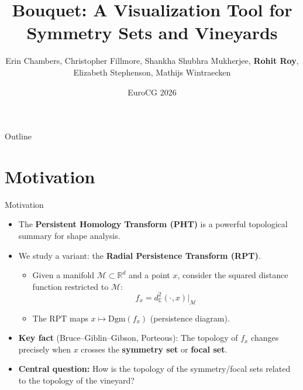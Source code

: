 \documentclass[
	11pt, %
]{beamer}
\title[Bouquet2D]{Bouquet: A Visualization Tool for Symmetry Sets and Vineyards}
\author[Rohit Roy]{Erin Chambers, Christopher Fillmore, Shankha Shubhra Mukherjee, \textcolor{myNewColorC}{\textbf{Rohit Roy}}, Elizabeth Stephenson, Mathijs Wintraecken}
\date[EuroCG 2026]{EuroCG 2026}
\newcommand{\M}{\mathcal{M}}
\begin{document}

\begin{frame}
	\titlepage
\end{frame}


\begin{frame}{Outline}
	\tableofcontents
\end{frame}


\section{Motivation}

\begin{frame}{Motivation}
    \begin{itemize}
        \item The \textbf{Persistent Homology Transform (PHT)} is a powerful topological summary for shape analysis.
        \pause
        \item We study a variant: the \textbf{Radial Persistence Transform (RPT)}.
        \begin{itemize}
            \item Given a manifold $\M \subset \mathbb{R}^d$ and a point $x$, consider the squared distance function restricted to $\M$:
            \[
            f_x = d_{\mathbb{E}}^2(\cdot, x)\big|_{\M}
            \]
            \item The RPT maps $x \mapsto \mathrm{Dgm}(f_x)$ (persistence diagram).
        \end{itemize}
        \pause
        \item \textbf{Key fact} (Bruce--Giblin--Gibson, Porteous): The topology of $f_x$ changes precisely when $x$ crosses the \textbf{symmetry set} or \textbf{focal set}.
        \pause
        \item \textbf{Central question:} How is the topology of the symmetry/focal sets related to the topology of the vineyard?
    \end{itemize}
\end{frame}
\end{document}
